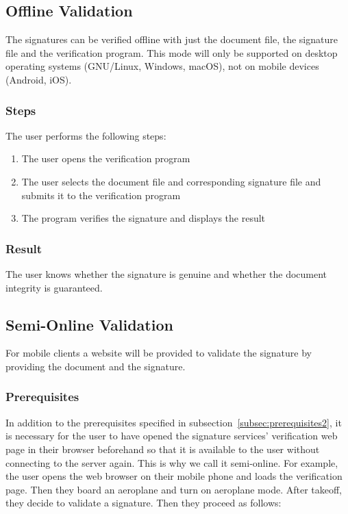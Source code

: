 \subsection{Offline Validation}\label{subsec:offline-validation2}
The signatures can be verified offline with just the document file, the signature file and the verification program.
This mode will only be supported on desktop operating systems (GNU/Linux, Windows, macOS), not on mobile devices (Android, iOS).

\subsubsection{Steps}
The user performs the following steps:
\begin{enumerate}
    \item The user opens the verification program
    \item The user selects the document file and corresponding signature file and submits it to the verification program
    \item The program verifies the signature and displays the result
\end{enumerate}
\subsubsection{Result}
The user knows whether the signature is genuine and whether the document integrity is guaranteed.

\subsection{Semi-Online Validation}\label{subsec:semi-online-validation}
For mobile clients a website will be provided to validate the signature by providing the document and the signature.

\subsubsection{Prerequisites}
In addition to the prerequisites specified in subsection~\ref{subsec:prerequisites2},
it is necessary for the user to have opened the signature services' verification web page in their browser beforehand
so that it is available to the user without connecting to the server again.
This is why we call it semi-online.
For example, the user opens the web browser on their mobile phone and loads the verification page.
Then they board an aeroplane and turn on aeroplane mode.
After takeoff, they decide to validate a signature.
Then they proceed as follows:

